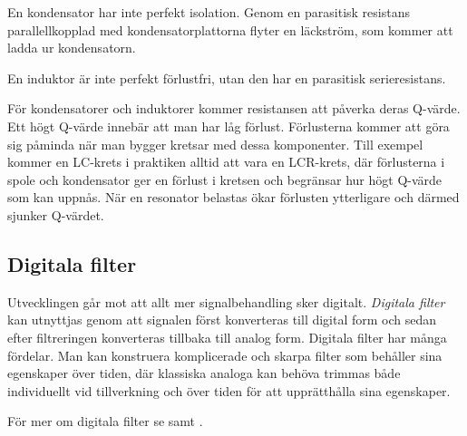 En kondensator har inte perfekt isolation.
Genom en parasitisk resistans parallellkopplad med kondensatorplattorna flyter
en läckström, som kommer att ladda ur kondensatorn.

En induktor är inte perfekt förlustfri, utan den har en parasitisk serieresistans.

För kondensatorer och induktorer kommer resistansen att påverka deras Q-värde.
Ett högt Q-värde innebär att man har låg förlust.
Förlusterna kommer att göra sig påminda när man bygger kretsar med dessa
komponenter.
Till exempel kommer en LC-krets i praktiken alltid att vara en LCR-krets, där
förlusterna i spole och kondensator ger en förlust i kretsen och begränsar hur
högt Q-värde som kan uppnås.
När en resonator belastas ökar förlusten ytterligare och därmed sjunker Q-värdet.


\subsection{Digitala filter}

Utvecklingen går mot att allt mer signalbehandling sker digitalt. 
\emph{Digitala filter} kan utnyttjas genom att signalen först konverteras till
digital form och sedan efter filtreringen konverteras tillbaka till analog form.
Digitala filter har många fördelar.
Man kan konstruera komplicerade och skarpa filter som behåller sina egenskaper
över tiden, där klassiska analoga kan behöva trimmas både individuellt vid
tillverkning och över tiden för att upprätthålla sina egenskaper.

För mer om digitala filter se  samt .
